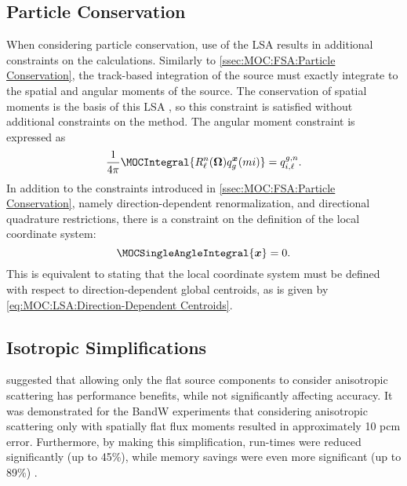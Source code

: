 {{        \subsection{Particle Conservation}{\label{ssec:MOC:LSA:Particle Conservation}
            When considering particle conservation, use of the \ac{LSA} results in additional constraints on the calculations.
            Similarly to \cref{ssec:MOC:FSA:Particle Conservation}, the track-based integration of the source must exactly integrate to the spatial and angular moments of the source.
            The conservation of spatial moments is the basis of this \ac{LSA} \cite{Ferrer2018}, so this constraint is satisfied without additional constraints on the method.
            The angular moment constraint is expressed as
            \begin{equation}\label{eq:MOC:LSA:Angular Moment Constaint}
                \rfourpi\MOCIntegral{\SH\source[mi][g][\loc]} = \srcF[i,\ell][g,n].
            \end{equation}
            In addition to the constraints introduced in \cref{ssec:MOC:FSA:Particle Conservation}, namely direction-dependent renormalization, and directional quadrature restrictions, there is a constraint on the definition of the local coordinate system:
            \begin{equation}\label{eq:MOC:LSA:Anisotropic Coordinate Constraint}
                \MOCSingleAngleIntegral{\loc} = 0.
            \end{equation}
            This is equivalent to stating that the local coordinate system must be defined with respect to direction-dependent global centroids, as is given by \cref{eq:MOC:LSA:Direction-Dependent Centroids}.
        }
        \subsection{Isotropic Simplifications}{\label{ssec:MOC:LSA:Isotropic Simplifications}
            \citet{Ferrer2016} suggested that allowing only the flat source components to consider anisotropic scattering has performance benefits, while not significantly affecting accuracy.
            It was demonstrated for the \acf{BandW} experiments \cite{Hoovler1980} that considering anisotropic scattering only with spatially flat flux moments resulted in approximately 10 pcm error.
            Furthermore, by making this simplification, run-times were reduced significantly (up to 45\%), while memory savings were even more significant (up to 89\%) \cite{Ferrer2016}.

}}}
